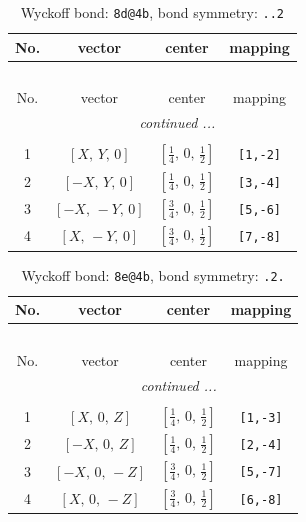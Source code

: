 \documentclass[fleqn,8pt]{jsarticle}
\begin{document}
\begin{longtable}{cccc}
\caption{Wyckoff bond: {\tt 8d@4b}, bond symmetry: {\tt ..2}}
 \\
 \hline \hline
No. & vector & center & mapping \\ \hline \endfirsthead

\multicolumn{3}{l}{\tablename\ \thetable{}} \\
 \hline \hline
No. & vector & center & mapping \\ \hline \endhead

 \hline \hline
\multicolumn{3}{r}{\footnotesize\it continued ...} \\ \endfoot

 \hline \hline
\multicolumn{3}{r}{} \\ \endlastfoot

1 & $\left[ X,\, Y,\, 0 \right]$ & $\left[ \frac{1}{4},\, 0,\, \frac{1}{2} \right]$ & {\tt [1,-2]} \\ \hline
2 & $\left[ - X,\, Y,\, 0 \right]$ & $\left[ \frac{1}{4},\, 0,\, \frac{1}{2} \right]$ & {\tt [3,-4]} \\ \hline
3 & $\left[ - X,\, - Y,\, 0 \right]$ & $\left[ \frac{3}{4},\, 0,\, \frac{1}{2} \right]$ & {\tt [5,-6]} \\ \hline
4 & $\left[ X,\, - Y,\, 0 \right]$ & $\left[ \frac{3}{4},\, 0,\, \frac{1}{2} \right]$ & {\tt [7,-8]} \\
\end{longtable}
\renewcommand{\arraystretch}{1.2}
\begin{longtable}{cccc}
\caption{Wyckoff bond: {\tt 8e@4b}, bond symmetry: {\tt .2.}}
 \\
 \hline \hline
No. & vector & center & mapping \\ \hline \endfirsthead

\multicolumn{3}{l}{\tablename\ \thetable{}} \\
 \hline \hline
No. & vector & center & mapping \\ \hline \endhead

 \hline \hline
\multicolumn{3}{r}{\footnotesize\it continued ...} \\ \endfoot

 \hline \hline
\multicolumn{3}{r}{} \\ \endlastfoot

1 & $\left[ X,\, 0,\, Z \right]$ & $\left[ \frac{1}{4},\, 0,\, \frac{1}{2} \right]$ & {\tt [1,-3]} \\ \hline
2 & $\left[ - X,\, 0,\, Z \right]$ & $\left[ \frac{1}{4},\, 0,\, \frac{1}{2} \right]$ & {\tt [2,-4]} \\ \hline
3 & $\left[ - X,\, 0,\, - Z \right]$ & $\left[ \frac{3}{4},\, 0,\, \frac{1}{2} \right]$ & {\tt [5,-7]} \\ \hline
4 & $\left[ X,\, 0,\, - Z \right]$ & $\left[ \frac{3}{4},\, 0,\, \frac{1}{2} \right]$ & {\tt [6,-8]} \\
\end{longtable}
\end{document}
